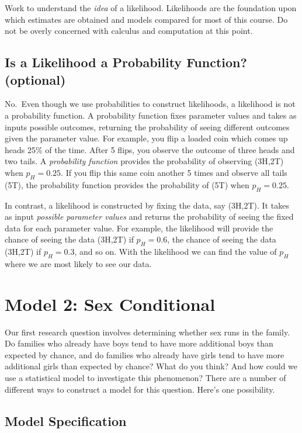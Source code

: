 \documentclass[
]{krantz}
\begin{document}
Work to understand the \emph{idea} of a likelihood. Likelihoods are the foundation upon which estimates are obtained and models compared for most of this course. Do not be overly concerned with calculus and computation at this point.

\subsection{Is a Likelihood a Probability Function? (optional)}\label{is-a-likelihood-a-probability-function-optional}

No.~Even though we use probabilities to construct likelihoods, a likelihood is not a probability function. A probability function fixes parameter values and takes as inputs possible outcomes, returning the probability of seeing different outcomes given the parameter value. For example, you flip a loaded coin which comes up heads 25\% of the time. After 5 flips, you observe the outcome of three heads and two tails. A \emph{probability function} provides the probability of observing (3H,2T) when \(p_H=0.25\). If you flip this same coin another 5 times and observe all tails (5T), the probability function provides the probability of (5T) when \(p_H=0.25\).

In contrast, a likelihood is constructed by fixing the data, say (3H,2T). It takes as input \emph{possible parameter values} and returns the probability of seeing the fixed data for each parameter value. For example, the likelihood will provide the chance of seeing the data (3H,2T) if \(p_H=0.6\), the chance of seeing the data (3H,2T) if \(p_H=0.3\), and so on. With the likelihood we can find the value of \(p_H\) where we are most likely to see our data.

\section{Model 2: Sex Conditional}\label{sex_conditional.sec}

Our first research question involves determining whether sex runs in the family. Do families who already have boys tend to have more additional boys than expected by chance, and do families who already have girls tend to have more additional girls than expected by chance? What do you think? And how could we use a statistical model to investigate this phenomenon? There are a number of different ways to construct a model for this question. Here's one possibility.

\subsection{Model Specification}\label{model-specification}
\end{document}
